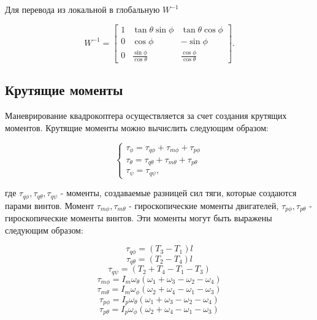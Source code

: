 Для перевода из локальной в глобальную \(W^{-1}\)

\begin{equation}
W^{-1} = \begin{bmatrix}
1 & \tan\theta \sin\phi & \tan\theta \cos\phi \\
0 & \cos\phi & -\sin\phi \\
0 & \frac{\sin\phi}{\cos\theta} & \frac{\cos\phi}{\cos\theta}
\end{bmatrix}.
\end{equation}

\subsection{Крутящие моменты}

Маневрирование квадрокоптера осуществляется за счет создания крутящих моментов. 
Крутящие моменты можно вычислить следующим образом:

\begin{equation}
\begin{cases}
    \tau_{\phi} = \tau_{q\phi} + \tau_{m\phi} + \tau_{p\phi}\\
    \tau_{\theta} = \tau_{q\theta} + \tau_{m\theta} + \tau_{p\theta}\\
    \tau_{\psi} = \tau_{q\psi},
\end{cases}
\end{equation}

где \(\tau_{q\phi}, \tau_{q\theta}, \tau_{q\psi}\) - моменты, создаваемые разницей сил тяги, которые создаются парами винтов.
Момент \(\tau_{m\phi}, \tau_{m\theta}\) - гироскопические моменты двигателей, \(\tau_{p\phi}, \tau_{p\theta}\)
 - гироскопические моменты винтов. Эти моменты могут быть выражены следующим образом:

\begin{equation}
\tau_{q\phi} = (T_3 - T_1)l
\end{equation}
\begin{equation}
\tau_{q\theta} = (T_2 - T_4)l 
\end{equation} 
\begin{equation}
\tau_{q\psi} = (T_2 + T_4 - T_1 - T_3)
\end{equation} 
\begin{equation}
\tau_{m\phi} = I_m \omega_{\theta}(\omega_1+\omega_3-\omega_2-\omega_4)
\end{equation} 
\begin{equation}
\tau_{m\theta} = I_m \omega_{\phi}(\omega_2+\omega_4-\omega_1-\omega_3)
\end{equation} 
\begin{equation}
\tau_{p\phi} = I_p \omega_{\theta}(\omega_1+\omega_3-\omega_2-\omega_4)
\end{equation} 
\begin{equation}
\tau_{p\theta} = I_p \omega_{\phi}(\omega_2+\omega_4-\omega_1-\omega_3)
\end{equation} 

